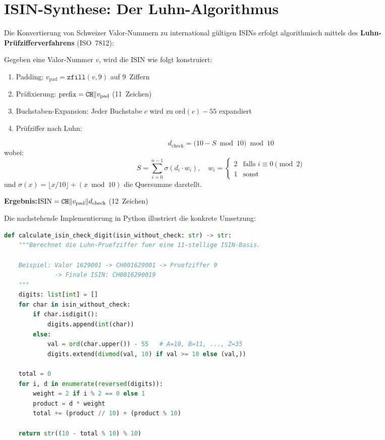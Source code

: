 \documentclass[11pt, a4paper, oneside, openany]{report}
\newcommand{\code}[1]{{\codefont\small\textcolor{DeepNavy}{#1}}}
\begin{document}
\section{ISIN-Synthese: Der Luhn-Algorithmus}
\label{sec:luhn}

Die Konvertierung von Schweizer Valor-Nummern zu international gültigen ISINs erfolgt algorithmisch mittels des \textbf{Luhn-Prüfzifferverfahrens} (ISO~7812):

\begin{mathbox}
Gegeben eine Valor-Nummer $v$, wird die ISIN wie folgt konstruiert:
\begin{enumerate}
  \item Padding: $v_{\text{pad}} = \texttt{zfill}(v, 9)$ auf 9~Ziffern
  \item Präfixierung: $\text{prefix} = \text{\texttt{CH}} \| v_{\text{pad}}$ (11~Zeichen)
  \item Buchstaben-Expansion: Jeder Buchstabe $c$ wird zu $\text{ord}(c) - 55$ expandiert
  \item Prüfziffer nach Luhn:
\end{enumerate}
\[
  d_{\text{check}} = \bigl(10 - S \bmod 10\bigr) \bmod 10
\]
wobei:
\[
  S = \sum_{i=0}^{n-1} \sigma\!\left(d_i \cdot w_i\right), \quad w_i = \begin{cases} 2 & \text{falls } i \equiv 0 \pmod{2} \\ 1 & \text{sonst} \end{cases}
\]
und $\sigma(x) = \lfloor x/10 \rfloor + (x \bmod 10)$ die Quersumme darstellt.

\textbf{Ergebnis:}\;$\text{ISIN} = \text{\texttt{CH}} \| v_{\text{pad}} \| d_{\text{check}}$ (12~Zeichen)
\end{mathbox}

\noindent Die nachstehende Implementierung in Python illustriert die konkrete Umsetzung:

\begin{lstlisting}[language=Python, caption={ISIN-Berechnung mit Luhn-Prüfziffer (\code{fetcher.py})}]
def calculate_isin_check_digit(isin_without_check: str) -> str:
    """Berechnet die Luhn-Pruefziffer fuer eine 11-stellige ISIN-Basis.

    Beispiel: Valor 1629001 -> CH001629001 -> Pruefziffer 9
              -> Finale ISIN: CH0016290019
    """
    digits: list[int] = []
    for char in isin_without_check:
        if char.isdigit():
            digits.append(int(char))
        else:
            val = ord(char.upper()) - 55   # A=10, B=11, ..., Z=35
            digits.extend(divmod(val, 10) if val >= 10 else (val,))

    total = 0
    for i, d in enumerate(reversed(digits)):
        weight = 2 if i % 2 == 0 else 1
        product = d * weight
        total += (product // 10) + (product % 10)

    return str((10 - total % 10) % 10)
\end{lstlisting}
\end{document}
